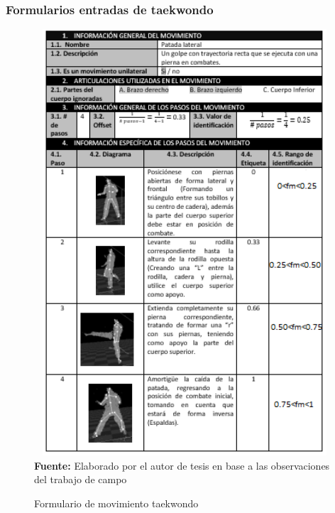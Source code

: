 \subsubsection{Formularios entradas de taekwondo}
\begin{figure}[H]
	\caption{Formulario de movimiento taekwondo}
	\label{fig:frmWhiteMov}
	\centering	\includegraphics[width=445px,height=600px]{graphics/resultados/movimientoTaekwondo.PNG} \\
	\textbf{Fuente:} Elaborado por el autor de tesis en base a las observaciones del trabajo de campo
\end{figure}

